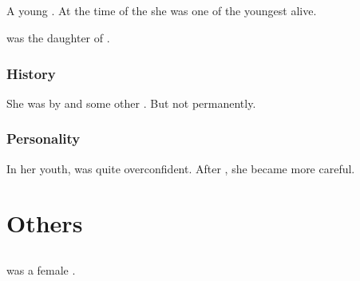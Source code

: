 \section{\Zessuruch}
\index{\Zessuruch}
A young \dragon. 
At the time of the \thirdbanewar{} she was one of the youngest \dragons alive. 

\Zessuruch was the daughter of \Thessulax. 









\subsection{History}
She was  by  and some other \resphain. 
But not permanently. 









\subsection{Personality}
In her youth, \Zessuruch was quite overconfident. 
After , she became more careful. 























\chapter{Others}















\section{\Hesherritan}
\index{\Hesherritan}
\Hesherritan was a female \ophidian.









